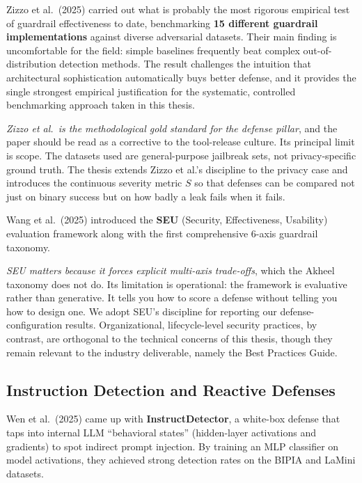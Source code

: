 Zizzo et al.\ (2025) carried out what is probably the most rigorous empirical test of guardrail effectiveness to date, benchmarking \textbf{15 different guardrail implementations} against diverse adversarial datasets. Their main finding is uncomfortable for the field: simple baselines frequently beat complex out-of-distribution detection methods. The result challenges the intuition that architectural sophistication automatically buys better defense, and it provides the single strongest empirical justification for the systematic, controlled benchmarking approach taken in this thesis.

\begin{critbox}
\textit{Zizzo et al.\ is the methodological gold standard for the defense pillar}, and the paper should be read as a corrective to the tool-release culture. Its principal limit is scope. The datasets used are general-purpose jailbreak sets, not privacy-specific ground truth. The thesis extends Zizzo et al.'s discipline to the privacy case and introduces the continuous severity metric $S$ so that defenses can be compared not just on binary success but on how badly a leak fails when it fails.
\end{critbox}

Wang et al.\ (2025) introduced the \textbf{SEU} (Security, Effectiveness, Usability) evaluation framework along with the first comprehensive 6-axis guardrail taxonomy.

\begin{critbox}
\textit{SEU matters because it forces explicit multi-axis trade-offs}, which the Akheel taxonomy does not do. Its limitation is operational: the framework is evaluative rather than generative. It tells you how to score a defense without telling you how to design one. We adopt SEU's discipline for reporting our defense-configuration results. Organizational, lifecycle-level security practices, by contrast, are orthogonal to the technical concerns of this thesis, though they remain relevant to the industry deliverable, namely the Best Practices Guide.
\end{critbox}

\subsection{Instruction Detection and Reactive Defenses}

Wen et al.\ (2025) came up with \textbf{InstructDetector}, a white-box defense that taps into internal LLM ``behavioral states'' (hidden-layer activations and gradients) to spot indirect prompt injection. By training an MLP classifier on model activations, they achieved strong detection rates on the BIPIA and LaMini datasets.

